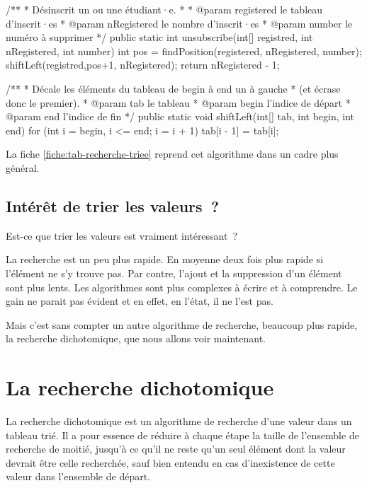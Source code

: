 			\begin{java}
/**
 * Désinscrit un ou une étudiant·e.
 * 
 * @param registered le tableau d'inscrit·es
 * @param nRegistered le nombre d'inscrit·es
 * @param number le numéro à supprimer
 */
public static int unsubscribe(int[] registred, int nRegistered,
				int number){
	int pos = findPosition(registered, nRegistered, number);
	shiftLeft(registred,pos+1, nRegistered);
	return nRegistered - 1;
}

/**
 * Décale les éléments du tableau de begin à end un à gauche
 * (et écrase donc le premier).
 * @param tab le tableau
 * @param begin l'indice de départ
 * @param end l'indice de fin
 */
public static void shiftLeft(int[] tab, int begin, int end){
	for (int i = begin, i <= end; i = i + 1){
		tab[i - 1] = tab[i];
	}
}
			\end{java}
			
			La fiche \vref{fiche:tab-recherche-triee} reprend cet algorithme
			dans un cadre plus général.

		\subsection{Intérêt de trier les valeurs~?}

			Est-ce que trier les valeurs est vraiment intéressant~?
			
			La recherche est un peu plus rapide. En moyenne deux fois plus
			rapide si l'élément ne s'y trouve pas. Par contre, l'ajout et la
			suppression d'un élément sont plus lents.  Les algorithmes sont plus
			complexes à écrire et à comprendre.  Le gain ne parait pas évident
			et en effet, en l’état, il ne l’est pas.
			
			Mais c’est sans compter un autre algorithme de recherche, beaucoup
			plus rapide, la recherche dichotomique, que nous allons voir
			maintenant.
			
	\section{La recherche dichotomique} 
	\label{chap:recherche-dichotomique}

		La recherche dichotomique est un algorithme de recherche d’une valeur
		dans un tableau trié.  Il a pour essence de réduire à chaque étape la
		taille de l’ensemble de recherche de moitié, jusqu’à ce qu’il ne reste
		qu’un seul élément dont la valeur devrait être celle recherchée, sauf
		bien entendu en cas d’inexistence de cette valeur dans l’ensemble de
		départ. 
	
